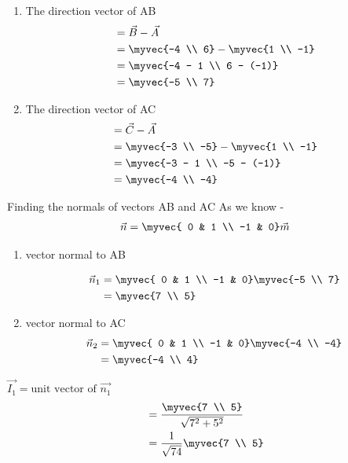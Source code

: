 \documentclass[journal,12pt,twocolumn]{IEEEtran}
\theoremstyle{remark}
\begin{document}
\begin{enumerate}
\item The direction vector of AB
\begin{align}
&= \vec{B} - \vec{A} \\
&= \myvec{-4 \\ 6} - \myvec{1 \\ -1}\\
&= \myvec{-4 - 1 \\ 6 - (-1)} \\
&= \myvec{-5 \\ 7}
\end{align}
\item The direction vector of AC
\begin{align}
&= \vec{C} - \vec{A} \\
&= \myvec{-3 \\ -5} - \myvec{1 \\ -1}\\
&= \myvec{-3 - 1 \\ -5 - (-1)} \\
&= \myvec{-4 \\ -4}
\end{align}
\end{enumerate}
Finding the normals of vectors AB and AC
As we know -
\begin{align}
\vec{n}=\myvec{ 0 & 1 \\ -1 & 0} \vec{m}
\end{align}
\begin{enumerate}
\item vector normal to AB

\begin{align}
\vec{n}_1 &= \myvec{ 0 & 1 \\ -1 & 0}\myvec{-5 \\ 7}\\
&= \myvec{7 \\ 5}
\end{align}
\item vector normal to AC
\begin{align}
\vec{n}_2 &= \myvec{ 0 & 1 \\ -1 & 0}\myvec{-4 \\ -4}\\
&= \myvec{-4 \\ 4}
\end{align}
\end{enumerate}
$\vec{I_1} = \text{unit vector of }\vec{n_1}$
\begin{align}
&= \frac{\myvec{7 \\ 5}}{\sqrt{7^2 + 5^2}}\\
&=\frac{1}{\sqrt{74}}\myvec{7 \\ 5}
\end{align}
\end{document}
